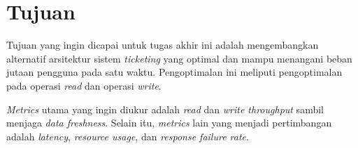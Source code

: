 \section{Tujuan}

Tujuan yang ingin dicapai untuk tugas akhir ini adalah mengembangkan alternatif arsitektur sistem \textit{ticketing} yang optimal dan mampu menangani beban jutaan pengguna pada satu waktu. Pengoptimalan ini meliputi pengoptimalan pada operasi \textit{read} dan operasi \textit{write}.

\textit{Metrics} utama yang ingin diukur adalah \textit{read} dan \textit{write throughput} sambil menjaga \textit{data freshness}. Selain itu, \textit{metrics} lain yang menjadi pertimbangan adalah \textit{latency}, \textit{resource usage}, dan \textit{response failure rate}.

